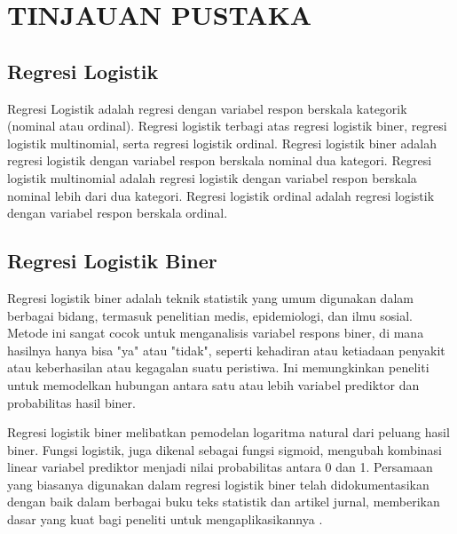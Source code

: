 

\chapter{TINJAUAN PUSTAKA}
\thispagestyle{empty}
\onehalfspacing

\hspace{\parindent}\lipsum[2]


\section{Regresi Logistik}
Regresi Logistik adalah regresi dengan variabel respon berskala kategorik
(nominal atau ordinal). Regresi logistik terbagi atas regresi logistik biner, regresi
logistik multinomial, serta regresi logistik ordinal. Regresi logistik biner adalah
regresi logistik dengan variabel respon berskala nominal dua kategori. Regresi
logistik multinomial adalah regresi logistik dengan variabel respon berskala
nominal lebih dari dua kategori. Regresi logistik ordinal adalah regresi logistik
dengan variabel respon berskala ordinal.


\section{Regresi Logistik Biner}
Regresi logistik biner adalah teknik statistik yang umum digunakan dalam
berbagai bidang, termasuk penelitian medis, epidemiologi, dan ilmu sosial.
Metode ini sangat cocok untuk menganalisis variabel respons biner, di mana
hasilnya hanya bisa "ya" atau "tidak", seperti kehadiran atau ketiadaan penyakit
atau keberhasilan atau kegagalan suatu peristiwa. Ini memungkinkan peneliti
untuk memodelkan hubungan antara satu atau lebih variabel prediktor dan
probabilitas hasil biner.

Regresi logistik biner melibatkan pemodelan logaritma natural dari
peluang hasil biner. Fungsi logistik, juga dikenal sebagai fungsi sigmoid,
mengubah kombinasi linear variabel prediktor menjadi nilai probabilitas antara 0
dan 1. Persamaan yang biasanya digunakan dalam regresi logistik biner telah
didokumentasikan dengan baik dalam berbagai buku teks statistik dan artikel
jurnal, memberikan dasar yang kuat bagi peneliti untuk mengaplikasikannya
\citep*{Shedriko2021}.

